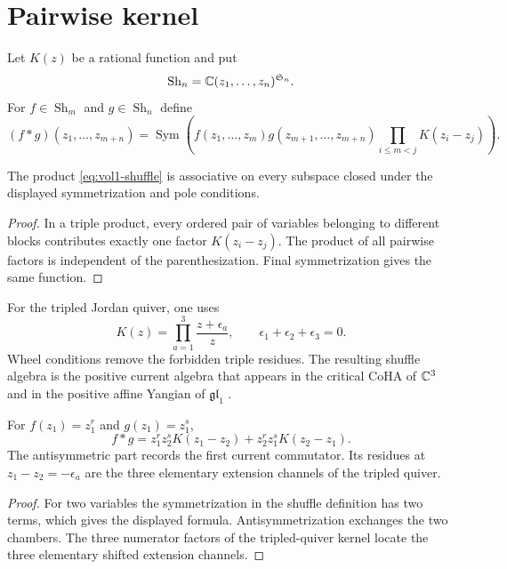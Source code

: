 \section{Pairwise kernel}
Let $K(z)$ be a rational function and put
\[
 \operatorname{Sh}_n=\mathbb C(z_1,\ldots,z_n)^{\mathfrak S_n}.
\]
For $f\in\operatorname{Sh}_m$ and $g\in\operatorname{Sh}_n$ define
\begin{equation}\label{eq:vol1-shuffle}
 (f*g)(z_1,\ldots,z_{m+n})
 =\operatorname{Sym}
 \left(
 f(z_1,\ldots,z_m)g(z_{m+1},\ldots,z_{m+n})
 \prod_{i\le m<j}K(z_i-z_j)
 \right).
\end{equation}

\begin{theorem}
The product \eqref{eq:vol1-shuffle} is associative on every subspace closed under the displayed symmetrization and pole conditions.
\end{theorem}
\begin{proof}
In a triple product, every ordered pair of variables belonging to different blocks contributes exactly one factor $K(z_i-z_j)$.  The product of all pairwise factors is independent of the parenthesization.  Final symmetrization gives the same function.
\end{proof}

For the tripled Jordan quiver, one uses
\[
 K(z)=\prod_{a=1}^3\frac{z+\epsilon_a}{z},
 \qquad \epsilon_1+\epsilon_2+\epsilon_3=0.
\]
Wheel conditions remove the forbidden triple residues.  The resulting shuffle algebra is the positive current algebra that appears in the critical CoHA of $\mathbb C^3$ and in the positive affine Yangian of $\mathfrak{gl}_1$ \cite{SVYangians,Tsymbaliuk}.

\begin{calculation}
For $f(z_1)=z_1^r$ and $g(z_1)=z_1^s$,
\[
 f*g
 =z_1^rz_2^sK(z_1-z_2)+z_2^rz_1^sK(z_2-z_1).
\]
The antisymmetric part records the first current commutator.  Its residues at $z_1-z_2=-\epsilon_a$ are the three elementary extension channels of the tripled quiver.
\end{calculation}
\begin{proof}
For two variables the symmetrization in the shuffle definition has two terms, which gives the displayed formula.  Antisymmetrization exchanges the two chambers.  The three numerator factors of the tripled-quiver kernel locate the three elementary shifted extension channels.
\end{proof}

